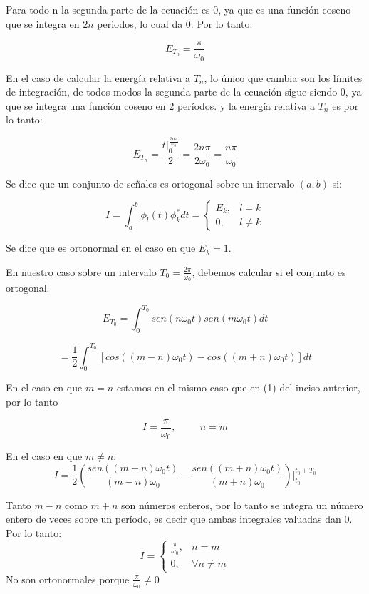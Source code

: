 \documentclass[12pt,a4paper]{report}
\begin{document}
\begin{enumerate}[label=\alph*),left=0pt]
\begin{itemize}[left=0pt]
    Para todo n la segunda parte de la ecuación es 0, ya que es una función coseno que se integra en $2n$ periodos, lo cual da 0. Por lo tanto:

    $$ E_{T_0}=\frac{\pi}{\omega_0} $$

    En el caso de calcular la energía relativa a $T_n$, lo único que cambia son los límites 
    de integración, de todos modos la segunda parte de la ecuación sigue siendo 0, ya que se 
    integra una función coseno en 2 períodos. y la energía relativa a $T_n$ es por lo tanto:

    $$ E_{T_n}=\frac{t|^{\frac{2n\pi}{\omega_0}}_0}{2}=\frac{2n\pi}{2\omega_0}=\frac{n\pi}{\omega_0} $$

        Se dice que un conjunto de señales es ortogonal sobre un intervalo $(a,b)$ si:

    $$
    I=\int^b_a\phi_l(t)\phi^*_kdt=\begin{cases}
        E_k,& l=k\\
        0, & l\neq k
    \end{cases}
    $$

    Se dice que es ortonormal en el caso en que $E_k=1$.

    En nuestro caso sobre un intervalo $T_0=\frac{2\pi}{\omega_0}$, debemos calcular si el conjunto es ortogonal.

    $$ E_{T_0}=\int_0^{T_0}sen(n\omega_0t)sen(m\omega_0t)dt $$

    $$ =\frac{1}{2}\int_0^{T_0}[cos((m-n)\omega_0 t)-cos((m+n)\omega_0 t)]dt $$

    En el caso en que $m=n$ estamos en el mismo caso que en (1) del inciso anterior, por lo tanto 

    $$
    I=\frac{\pi}{\omega_0}, \hspace{1cm}n=m
    $$

    En el caso en que $m\neq n$:
    $$
    I=\frac{1}{2}(\frac{sen((m-n)\omega_0t)}{(m-n)\omega_0}-\frac{sen((m+n)\omega_0t)}{(m+n)\omega_0})|^{t_0+T_0}_{t_0}
    $$

    Tanto $m-n$ como $m+n$ son números enteros, por lo tanto se integra un número entero de veces sobre un período, es decir que ambas integrales valuadas dan 0. Por lo tanto:
    $$
    I=\begin{cases}
        \frac{\pi}{\omega_0},&n=m\\
        0,&\forall n\neq m
    \end{cases}
    $$
    No son ortonormales porque $\frac{\pi}{\omega_0}\neq 0$	



\end{itemize}
\end{enumerate}
\end{document}
